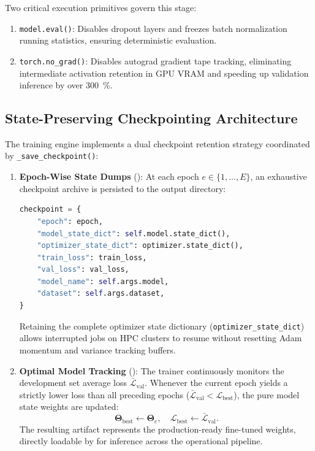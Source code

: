 Two critical execution primitives govern this stage:
\begin{enumerate}
  \item \texttt{model.eval()}: Disables dropout layers and freezes batch
    normalization running statistics, ensuring deterministic evaluation.
  \item \texttt{torch.no\_grad()}: Disables autograd gradient tape tracking,
    eliminating intermediate activation retention in \ac{GPU} VRAM
    and speeding up
    validation inference by over \qty{300}{\percent}.
\end{enumerate}

\subsection{State-Preserving Checkpointing Architecture}
\label{subsec:checkpointing_arch}

The training engine implements a dual checkpoint retention strategy coordinated
by \texttt{\_save\_checkpoint()}:
\begin{enumerate}
  \item \textbf{Epoch-Wise State Dumps} ():
    At each epoch $e \in \{1, \dots, E\}$, an exhaustive checkpoint archive is
    persisted to the output directory:
    \begin{lstlisting}[language=python,basicstyle=\scriptsize\ttfamily]
checkpoint = {
    "epoch": epoch,
    "model_state_dict": self.model.state_dict(),
    "optimizer_state_dict": optimizer.state_dict(),
    "train_loss": train_loss,
    "val_loss": val_loss,
    "model_name": self.args.model,
    "dataset": self.args.dataset,
}
    \end{lstlisting}
    Retaining the complete optimizer state dictionary
    (\texttt{optimizer\_state\_dict})
    allows interrupted jobs on \ac{HPC} clusters to resume without
    resetting Adam
    momentum and variance tracking buffers.
  \item \textbf{Optimal Model Tracking} ():
    The trainer continuously monitors the development set average loss
    $\bar{\mathcal{L}}_{\mathrm{val}}$. Whenever the current epoch
    yields a strictly
    lower loss than all preceding epochs
    ($\bar{\mathcal{L}}_{\mathrm{val}} < \mathcal{L}_{\mathrm{best}}$),
    the pure model state weights are updated:
    \begin{equation}
      \bm{\Theta}_{\mathrm{best}} \leftarrow \bm{\Theta}_e, \quad
      \mathcal{L}_{\mathrm{best}} \leftarrow \bar{\mathcal{L}}_{\mathrm{val}}.
      \label{eq:best_model_update}
    \end{equation}
    The resulting  artifact represents the production-ready
    fine-tuned weights, directly loadable by  for
    inference across the operational pipeline.
\end{enumerate}

